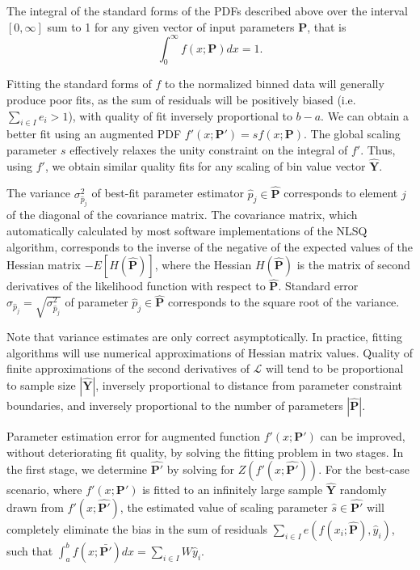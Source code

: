 \message{ !name(pspdistfit_article.tex)}\documentclass{article}
\begin{document}
The integral of the standard forms of the PDFs described above over the interval $[0, \infty]$ sum to 1 for any given vector of input parameters $\bm{P}$, that is
\begin{equation}
\int_0^\infty f(x; \bm{P}) dx =  1.
\end{equation}

Fitting the standard forms of $f$ to the normalized binned data will generally produce poor fits, as the sum of residuals will be positively biased (i.e.~$\sum_{i \in I} e_i > 1$), with quality of fit inversely proportional to $b - a$.
We can obtain a better fit using an augmented PDF $f'(x; \bm{P'}) = sf(x; \bm{P})$.
The global scaling parameter $s$ effectively relaxes the unity constraint on the integral of $f'$.
Thus, using $f'$, we obtain similar quality fits for any scaling of bin value vector $\bm{\hat{Y}}$.

The variance $\sigma^2_{\hat{p}_j}$ of best-fit parameter estimator $\hat{p}_j \in \bm{\hat{P}}$ corresponds to element $j$ of the diagonal of the covariance matrix.
The covariance matrix, which automatically calculated by most software implementations of the NLSQ algorithm, corresponds to the inverse of the  negative of the expected values of the Hessian matrix $-E[H(\bm{\hat{P}})]$, where the Hessian $H(\bm{\hat{P}})$ is the matrix of second derivatives of the likelihood function with respect to $\bm{\hat{P}}$.
Standard error $\sigma_{\hat{p}_j} = \sqrt{\sigma^2_{\hat{p}_j}}$ of parameter $\hat{p}_{j} \in \bm{\hat{P}}$ corresponds to the square root of the variance.

Note that variance estimates are only correct asymptotically.
In practice, fitting algorithms will use numerical approximations of Hessian matrix values.
Quality of finite approximations of the second derivatives of $\mathcal{L}$ will tend to be proportional to sample size $|\bm{\hat{Y}}|$, inversely proportional to distance from parameter constraint boundaries, and inversely proportional to the number of parameters $|\bm{\hat{P}}|$.

Parameter estimation error for augmented function  $f'(x; \bm{P'})$ can be improved, without deteriorating fit quality, by solving the fitting problem in two stages.
In the first stage, we determine $\bm{\hat{P'}}$ by solving for $Z(f'(x; \bm{\hat{P'}}))$.
For the best-case scenario, where $f'(x; \bm{P'})$ is fitted to an infinitely large sample $\bm{\hat{Y}}$ randomly drawn from $f'(x; \bm{\hat{P'}})$, the estimated value of scaling parameter $\hat{s} \in \bm{\hat{P'}}$ will completely eliminate the bias in the sum of residuals $\sum_{i \in I} e(f(x_i; \bm{\hat{P}}), \hat{y}_i)$, such that $\int_a^b f(x; \bm{\bar{P'}}) dx = \sum_{i \in I} W\hat{y}_i$.
\end{document}
